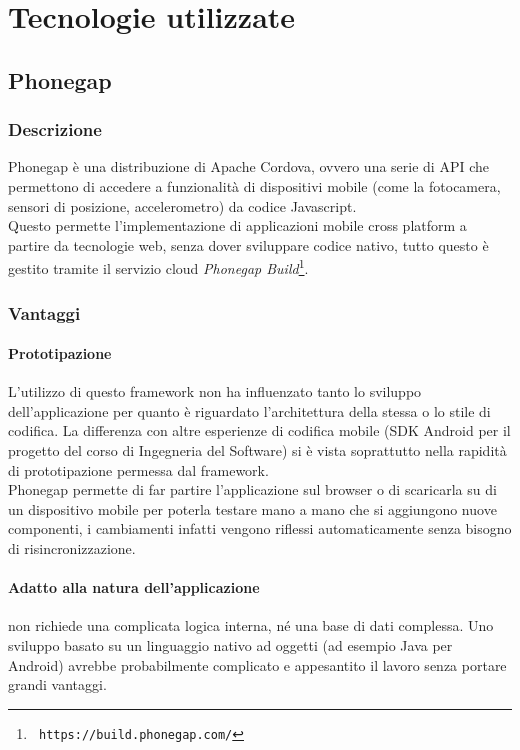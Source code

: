 \section{Tecnologie utilizzate}

\subsection{Phonegap}\label{phonegap}

\subsubsection{Descrizione}
Phonegap è una distribuzione di Apache Cordova, ovvero una serie di API che permettono
di accedere a funzionalità di dispositivi mobile (come la fotocamera, sensori di posizione,
accelerometro) da codice Javascript. \\

Questo permette l'implementazione di applicazioni mobile cross platform a partire da 
tecnologie web, senza dover sviluppare codice nativo, tutto questo è gestito tramite il
servizio cloud \textit{Phonegap Build}\footnote{\texttt{ https://build.phonegap.com/}}. \\

\subsubsection{Vantaggi}

\paragraph{Prototipazione}
L'utilizzo di questo framework non ha influenzato tanto lo sviluppo dell'applicazione
per quanto è riguardato l'architettura della stessa o lo stile di codifica. La differenza
con altre esperienze di codifica mobile (SDK Android per il progetto del corso di Ingegneria
del Software) si è vista soprattutto nella rapidità di prototipazione permessa dal framework. \\
Phonegap permette di far partire l'applicazione sul browser o di scaricarla su di un
dispositivo mobile per poterla testare mano a mano che si aggiungono nuove componenti,
i cambiamenti infatti vengono riflessi automaticamente senza bisogno di risincronizzazione.

\paragraph{Adatto alla natura dell'applicazione}
\fiscoloMobile{} non richiede una complicata logica interna, né una base di dati complessa.
Uno sviluppo basato su un linguaggio nativo ad oggetti (ad esempio Java per Android) avrebbe
probabilmente complicato e appesantito il lavoro senza portare grandi vantaggi. \\

